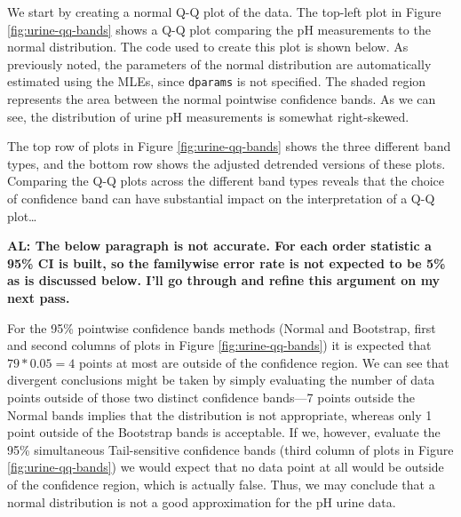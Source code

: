 We start by creating a normal Q-Q plot of the data. The top-left plot in
Figure \ref{fig:urine-qq-bands} shows a Q-Q plot comparing the pH
measurements to the normal distribution. The code used to create this
plot is shown below. As previously noted, the parameters of the normal
distribution are automatically estimated using the MLEs, since
\texttt{dparams} is not specified. The shaded region represents the area
between the normal pointwise confidence bands. As we can see, the
distribution of urine pH measurements is somewhat right-skewed.

\begin{Schunk}
\end{Schunk}

The top row of plots in Figure \ref{fig:urine-qq-bands} shows the three
different band types, and the bottom row shows the adjusted detrended
versions of these plots. Comparing the Q-Q plots across the different
band types reveals that the choice of confidence band can have
substantial impact on the interpretation of a Q-Q plot\ldots{}

\textbf{AL: The below paragraph is not accurate. For each order
statistic a 95\% CI is built, so the familywise error rate is not
expected to be 5\% as is discussed below. I'll go through and refine
this argument on my next pass.}

For the 95\% pointwise confidence bands methods (Normal and Bootstrap,
first and second columns of plots in Figure \ref{fig:urine-qq-bands}) it
is expected that \(79*0.05=4\) points at most are outside of the
confidence region. We can see that divergent conclusions might be taken
by simply evaluating the number of data points outside of those two
distinct confidence bands---7 points outside the Normal bands implies
that the distribution is not appropriate, whereas only 1 point outside
of the Bootstrap bands is acceptable. If we, however, evaluate the 95\%
simultaneous Tail-sensitive confidence bands (third column of plots in
Figure \ref{fig:urine-qq-bands}) we would expect that no data point at
all would be outside of the confidence region, which is actually false.
Thus, we may conclude that a normal distribution is not a good
approximation for the pH urine data.

